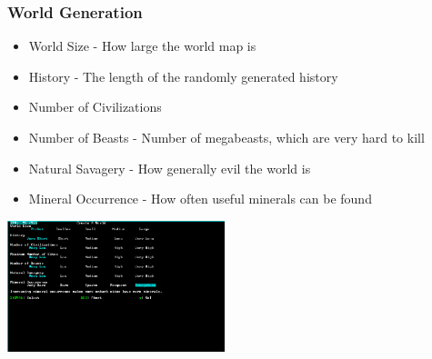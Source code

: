 \begin{frame}[fragile]
\frametitle{World Generation}
\begin{itemize}
\item World Size - How large the world map is
\item History - The length of the randomly generated history
\item Number of Civilizations
\item Number of Beasts - Number of megabeasts, which are very hard to kill
\item Natural Savagery - How generally evil the world is
\item Mineral Occurrence - How often useful minerals can be found
\end{itemize}

\includegraphics[height=1.5in]{img/makeworld}
\end{frame}
